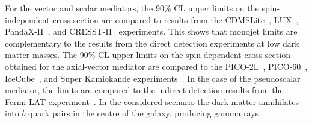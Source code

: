 For the vector and scalar mediators, the 90\% CL upper limits on the spin-independent cross section are compared to results from the CDMSLite~\cite{Agnese:2015nto}, LUX~\cite{Akerib:2015rjg}, PandaX-II~\cite{Tan:2016zwf}, and CRESST-II~\cite{Angloher:2015ewa} experiments. This shows that monojet limits are complementary to the results from the direct detection experiments at low dark matter masses. The 90\% CL upper limits on the spin-dependent cross section obtained for the axial-vector mediator are compared to the PICO-2L~\cite{Amole:2016pye}, PICO-60~\cite{Amole:2015pla}, IceCube~\cite{Aartsen:2016exj}, and Super Kamiokande experiments~\cite{Choi:2015ara}. In the case of the pseudoscalar mediator, the limits are compared to the indirect detection results from the Fermi-LAT experiment~\cite{Ackermann:2011wa,Abdo:2010ex}. In the considered scenario the dark matter annihilates into $b$ quark pairs in the centre of the galaxy, producing gamma rays.

\clearpage{\pagestyle{empty}\cleardoublepage}
